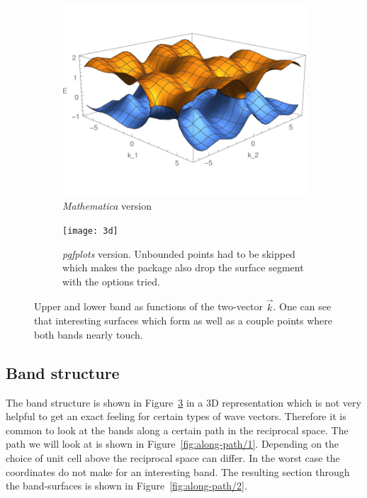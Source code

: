 \documentclass[11pt, english, fleqn, DIV=15, headinclude, BCOR=1cm]{scrartcl}
\begin{document}
\begin{figure}
    \begin{subfigure}[c]{0.48\linewidth}
    \centering
    \includegraphics[width=\linewidth]{2-Eigenvalues.pdf}
    \caption{%
        \emph{Mathematica} version
    }
    \label{fig:}
    \end{subfigure}
    \hfill
    \begin{subfigure}[c]{0.48\linewidth}
    \centering
    \texttt{[image: 3d]}
    \caption{%
        \emph{pgfplots} version. Unbounded points had to be skipped which makes
        the package also drop the surface segment with the options tried.
    }
    \label{fig:}
    \end{subfigure}
    \caption{%
        Upper and lower band as functions of the two-vector $\vec k$. One can
        see that interesting surfaces which form as well as a couple points
        where both bands nearly touch.
    }
    \label{fig:band-3d}
\end{figure}

\subsection{Band structure}

The band structure is shown in Figure~\ref{fig:band-3d} in a 3D representation
which is not very helpful to get an exact feeling for certain types of wave
vectors. Therefore it is common to look at the bands along a certain path in
the reciprocal space. The path we will look at is shown in
Figure~\ref{fig:along-path/1}. Depending on the choice of unit cell above the
reciprocal space can differ. In the worst case the coordinates do not make for
an interesting band. The resulting section through the band-surfaces is shown
in Figure~\ref{fig:along-path/2}.
\end{document}
